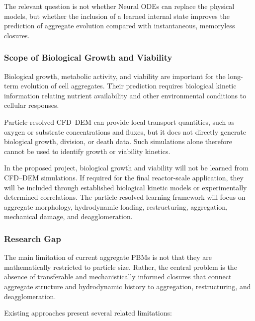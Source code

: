\documentclass[11pt,a4paper,twoside]{scrartcl}
\begin{document}
The relevant question is not whether Neural ODEs can replace the physical models, but whether the inclusion of a learned internal state improves the prediction of aggregate evolution compared with instantaneous, memoryless closures.

\subsubsection{Scope of Biological Growth and Viability}

Biological growth, metabolic activity, and viability are important for the long-term evolution of cell aggregates. Their prediction requires biological kinetic information relating nutrient availability and other environmental conditions to cellular responses.

Particle-resolved CFD--DEM can provide local transport quantities, such as oxygen or substrate concentrations and fluxes, but it does not directly generate biological growth, division, or death data. Such simulations alone therefore cannot be used to identify growth or viability kinetics.

In the proposed project, biological growth and viability will not be learned from CFD--DEM simulations. If required for the final reactor-scale application, they will be included through established biological kinetic models or experimentally determined correlations. The particle-resolved learning framework will focus on aggregate morphology, hydrodynamic loading, restructuring, aggregation, mechanical damage, and deagglomeration.

\subsubsection{Research Gap}

The main limitation of current aggregate PBMs is not that they are mathematically restricted to particle size. Rather, the central problem is the absence of transferable and mechanistically informed closures that connect aggregate structure and hydrodynamic history to aggregation, restructuring, and deagglomeration.

Existing approaches present several related limitations:
\end{document}
